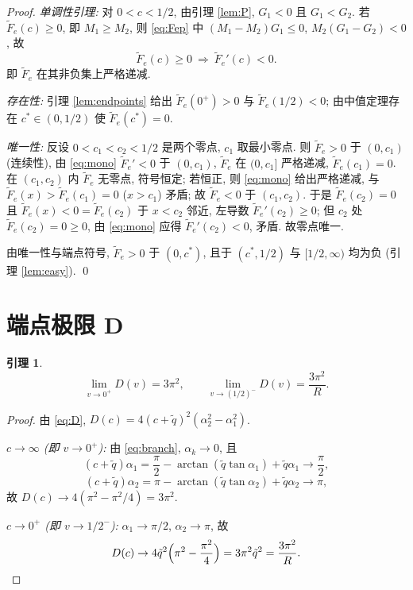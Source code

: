 \documentclass[UTF8]{ctexart}
\newtheorem{lemma}[theorem]{引理}
\begin{document}
\begin{proof}
\emph{单调性引理:} 对 $0<c<1/2$, 由引理 \ref{lem:P}, $G_1<0$ 且 $G_1<G_2$. 若
$\widetilde F_e(c)\ge0$, 即 $M_1\ge M_2$, 则 \eqref{eq:Fep} 中
$(M_1-M_2)G_1\le0$, $M_2(G_1-G_2)<0$, 故
\begin{equation}
	\widetilde F_e(c)\ge0\ \Longrightarrow\ \widetilde F_e'(c)<0.
	\label{eq:mono}
\end{equation}
即 $\widetilde F_e$ 在其非负集上严格递减.

\emph{存在性:} 引理 \ref{lem:endpoints} 给出 $\widetilde F_e(0^+)>0$ 与
$\widetilde F_e(1/2)<0$; 由中值定理存在 $c^*\in(0,1/2)$ 使 $\widetilde F_e(c^*)=0$.

\emph{唯一性:} 反设 $0<c_1<c_2<1/2$ 是两个零点, $c_1$ 取最小零点. 则
$\widetilde F_e>0$ 于 $(0,c_1)$ (连续性), 由 \eqref{eq:mono}
$\widetilde F_e'<0$ 于 $(0,c_1)$, $\widetilde F_e$ 在 $(0,c_1]$ 严格递减,
$\widetilde F_e(c_1)=0$. 在 $(c_1,c_2)$ 内 $\widetilde F_e$ 无零点, 符号恒定;
若恒正, 则 \eqref{eq:mono} 给出严格递减, 与 $\widetilde F_e(x)>\widetilde F_e(c_1)=0$
($x>c_1$) 矛盾; 故 $\widetilde F_e<0$ 于 $(c_1,c_2)$. 于是
$\widetilde F_e(c_2)=0$ 且 $\widetilde F_e(x)<0=\widetilde F_e(c_2)$ 于
$x<c_2$ 邻近, 左导数 $\widetilde F_e'(c_2)\ge0$; 但 $c_2$ 处
$\widetilde F_e(c_2)=0\ge0$, 由 \eqref{eq:mono} 应得 $\widetilde F_e'(c_2)<0$,
矛盾. 故零点唯一.

由唯一性与端点符号, $\widetilde F_e>0$ 于 $(0,c^*)$, 且于 $(c^*,1/2)$ 与
$[1/2,\infty)$ 均为负 (引理 \ref{lem:easy}). \qed
\end{proof}

\section{端点极限 D}\label{sec:endpoints}

\begin{lemma}\label{lem:Dlimits}
\begin{equation}
	\lim_{v\to0^+}D(v)=3\pi^2,\qquad
	\lim_{v\to(1/2)^-}D(v)=\frac{3\pi^2}{R}.
\end{equation}
\end{lemma}

\begin{proof}
由 \eqref{eq:D}, $D(c)=4(c+\tilde q)^2(\alpha_2^2-\alpha_1^2)$.

\emph{$c\to\infty$ (即 $v\to0^+$):} 由 \eqref{eq:branch}, $\alpha_k\to0$, 且
\begin{equation}
	(c+\tilde q)\alpha_1=\frac{\pi}{2}-\arctan(\tilde q\tan\alpha_1)+\tilde q\alpha_1
	\longrightarrow\frac{\pi}{2},
\end{equation}
\begin{equation}
	(c+\tilde q)\alpha_2=\pi-\arctan(\tilde q\tan\alpha_2)+\tilde q\alpha_2
	\longrightarrow\pi,
\end{equation}
故 $D(c)\to4(\pi^2-\pi^2/4)=3\pi^2$.

\emph{$c\to0^+$ (即 $v\to1/2^-$):} $\alpha_1\to\pi/2$, $\alpha_2\to\pi$, 故
\begin{equation}
	D(c)\to4\tilde q^2\Bigl(\pi^2-\frac{\pi^2}{4}\Bigr)
	=3\pi^2\tilde q^2=\frac{3\pi^2}{R}.
	\qedhere
\end{equation}
\end{proof}
\end{document}
